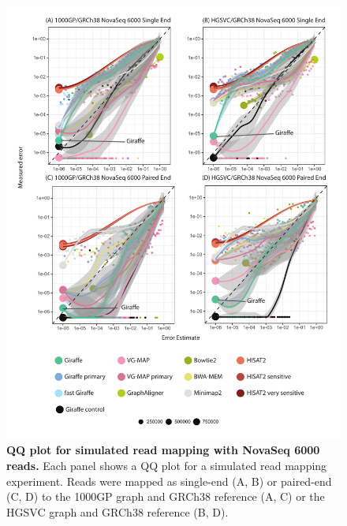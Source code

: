 \documentclass[11pt]{ucscthesis}
\begin{document}
\begin{figure}[H]
    \centering
    \includegraphics[width=.8\linewidth]{aim2_supplement_novaseq6000-qq.pdf}
    \caption[QQ plot for simulated read mapping with NovaSeq 6000 reads]{\textbf{QQ plot for simulated read mapping with NovaSeq 6000 reads.} Each panel shows a QQ plot for a simulated read mapping experiment. Reads were mapped as single-end (A, B) or paired-end (C, D) to the 1000GP graph and GRCh38 reference (A, C) or the HGSVC graph and GRCh38 reference (B, D).}
    \label{fig:aim2_supplement_novaseq6000_qq}
\end{figure}
\end{document}

